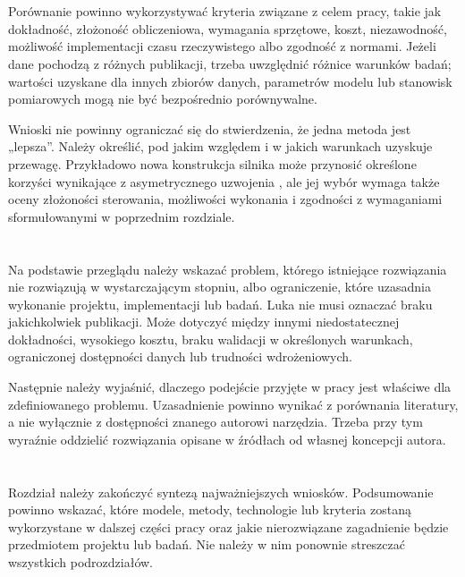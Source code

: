 \section{}

Porównanie powinno wykorzystywać kryteria związane z celem pracy, takie jak dokładność, złożoność obliczeniowa, wymagania sprzętowe, koszt, niezawodność, możliwość implementacji czasu rzeczywistego albo zgodność z normami. Jeżeli dane pochodzą z różnych publikacji, trzeba uwzględnić różnice warunków badań; wartości uzyskane dla innych zbiorów danych, parametrów modelu lub stanowisk pomiarowych mogą nie być bezpośrednio porównywalne.

Wnioski nie powinny ograniczać się do stwierdzenia, że jedna metoda jest „lepsza”. Należy określić, pod jakim względem i w jakich warunkach uzyskuje przewagę. Przykładowo nowa konstrukcja silnika może przynosić określone korzyści wynikające z asymetrycznego uzwojenia \cite{7396957}, ale jej wybór wymaga także oceny złożoności sterowania, możliwości wykonania i zgodności z wymaganiami sformułowanymi w poprzednim rozdziale.

\section{}

Na podstawie przeglądu należy wskazać problem, którego istniejące rozwiązania nie rozwiązują w wystarczającym stopniu, albo ograniczenie, które uzasadnia wykonanie projektu, implementacji lub badań. Luka nie musi oznaczać braku jakichkolwiek publikacji. Może dotyczyć między innymi niedostatecznej dokładności, wysokiego kosztu, braku walidacji w określonych warunkach, ograniczonej dostępności danych lub trudności wdrożeniowych.

Następnie należy wyjaśnić, dlaczego podejście przyjęte w pracy jest właściwe dla zdefiniowanego problemu. Uzasadnienie powinno wynikać z porównania literatury, a nie wyłącznie z dostępności znanego autorowi narzędzia. Trzeba przy tym wyraźnie oddzielić rozwiązania opisane w źródłach od własnej koncepcji autora.

\section{}

Rozdział należy zakończyć syntezą najważniejszych wniosków. Podsumowanie powinno wskazać, które modele, metody, technologie lub kryteria zostaną wykorzystane w dalszej części pracy oraz jakie nierozwiązane zagadnienie będzie przedmiotem projektu lub badań. Nie należy w nim ponownie streszczać wszystkich podrozdziałów.

